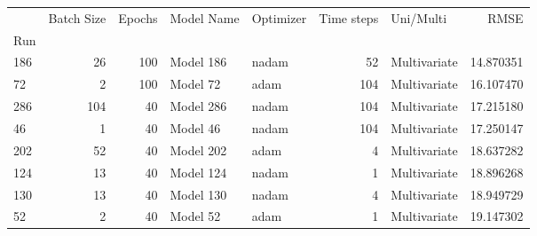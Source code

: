 \begin{tabular}{lrrllrlr}
\toprule
 & Batch Size & Epochs & Model Name & Optimizer & Time steps & Uni/Multi & RMSE \\
Run &  &  &  &  &  &  &  \\
\midrule
186 & 26 & 100 & Model 186 & nadam & 52 & Multivariate & 14.870351 \\
72 & 2 & 100 & Model 72 & adam & 104 & Multivariate & 16.107470 \\
286 & 104 & 40 & Model 286 & nadam & 104 & Multivariate & 17.215180 \\
46 & 1 & 40 & Model 46 & nadam & 104 & Multivariate & 17.250147 \\
202 & 52 & 40 & Model 202 & adam & 4 & Multivariate & 18.637282 \\
124 & 13 & 40 & Model 124 & nadam & 1 & Multivariate & 18.896268 \\
130 & 13 & 40 & Model 130 & nadam & 4 & Multivariate & 18.949729 \\
52 & 2 & 40 & Model 52 & adam & 1 & Multivariate & 19.147302 \\
\bottomrule
\end{tabular}

